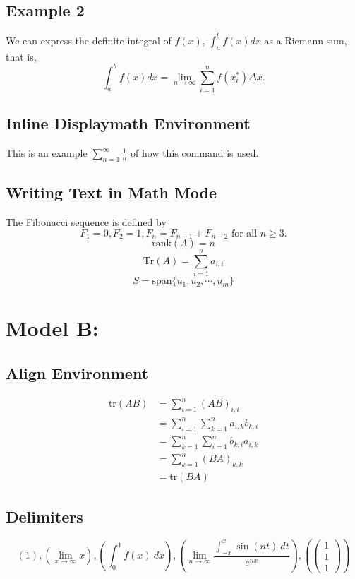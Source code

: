 \documentclass[12pt, a4paper]{article}
\begin{document}
\subsection*{Example 2}
We can express the definite integral of $f(x)$, $\int_{a}^{b} f(x) dx$ as a Riemann sum, that is,
\[  \int_{a}^{b} f(x) dx = \lim_{n \rightarrow \infty} \sum_{i=1}^n f(x_i^*) \Delta x.\]
\subsection*{Inline Displaymath Environment}
This is an example $\displaystyle \sum^\infty_{n=1} \frac{1}{n}$ of how this command is used.
\subsection*{Writing Text in Math Mode}
The Fibonacci sequence is defined by
\[ F_1 = 0, F_2 =1, F_n= F_{n-1}+F_{n-2} \text{ for all } n \geq 3.
\]
\newline
\[ \text{rank}(A) = n\]
\[\text{Tr}(A) = \sum_{i=1}^n a_{i,i}\]
\[S = \text{span}\{u_1,u_2,\cdots, u_m\}\]

\newpage

\section{Model B: }
\subsection*{Align Environment}
\begin{align*}
    \text{tr}(AB) &= \sum^n_{i=1}(AB)_{i,i} \\
    &= \sum^n_{i=1}\sum^n_{k=1}a_{i,k}b_{k,i} \\
    &= \sum^n_{k=1}\sum^n_{i=1}b_{k,i}a_{i,k} \\
    &= \sum^n_{k=1}(BA)_{k,k} \\
    &= \text{tr}(BA)
\end{align*}

\subsection*{Delimiters}
\[ \left( 1 \right) , 
\left( \lim_{x\to\infty} x \right) , 
\left( \int^1_0 f(x)\ dx \right) , 
\left( \lim_{n\to\infty} \frac{\int^x_{-x} \sin(nt)\ dt}{e^{nx}} \right) , 
\left( \begin{pmatrix} 1 \\ 1 \\ 1 \end{pmatrix} \right) \] 
\end{document}
